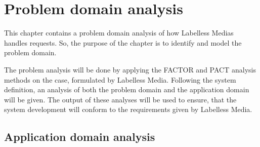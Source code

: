\chapter{Problem domain analysis}\label{ch:problemanalysis}

This chapter contains a problem domain analysis of how Labelless Medias handles requests. So, the purpose of the chapter is to identify and model the problem domain.


The problem analysis will be done by applying the FACTOR and PACT analysis methods on the case, formulated by Labelless Media. Following the system definition, an analysis of both the problem domain and the application domain will be given. The output of these analyses will be used to ensure, that the system development will conform to the requirements given by Labelless Media.




\section{Application domain analysis}

